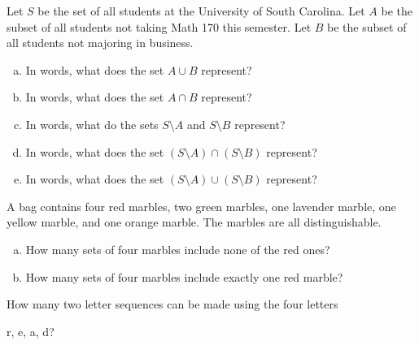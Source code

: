 \documentclass[12pt]{amsart}
\begin{document}
\begin{thm}[10 Points]\label{ex1}
  Let $S$ be the set of all students at the University of South Carolina.
  Let $A$ be the subset of all students not taking Math 170 this semester.
  Let $B$ be the subset of all students not majoring in business.
  \begin{enumerate}[(a)]
  \item
    In words, what does the set $A \cup B$ represent?
    \vspace{1.5in}
  \item
    In words, what does the set $A \cap B$ represent?
    \vspace{1.5in}
  \item
    In words, what do the sets $S \setminus A$ and $S \setminus B$ represent?
    \vspace{1.5in}
  \item
    In words, what does the set $\left(S \setminus A\right) \cap \left(S \setminus B\right)$ represent?
    \vspace{1.5in}
  \item
    In words, what does the set $\left(S \setminus A\right) \cup \left(S \setminus B\right)$ represent?
  \end{enumerate}
  
\end{thm}

\newpage
\begin{thm}[20 Points]\label{ex2}
  A bag contains four red marbles, two green marbles, one lavender marble, one yellow marble, and one orange marble.
  The marbles are all distinguishable.
  \begin{enumerate}[(a)]
  \item
    How many sets of four marbles include none of the red ones?
    \vspace{4in}
  \item
    How many sets of four marbles include exactly one red marble?
  \end{enumerate}  
\end{thm}

\newpage

\begin{thm}[12 Points]\label{ex3}
  How many two letter sequences can be made using the four letters 
  \begin{center}r, e, a, d?\end{center}
\end{thm}

\newpage
\end{document}
